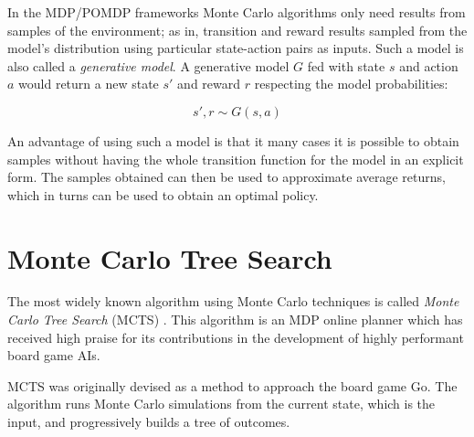 In the MDP/POMDP frameworks Monte Carlo algorithms only need results from samples of the
environment; as in, transition and reward results sampled from the model's distribution using
particular state-action pairs as inputs. Such a model is also called a \textit{generative model}. A
generative model $G$ fed with state $s$ and action $a$ would return a new state $s'$ and reward $r$
respecting the model probabilities:

\[ s', r \sim G(s, a) \]

An advantage of using such a model is that it many cases it is possible to obtain samples without
having the whole transition function for the model in an explicit form. The samples obtained can
then be used to approximate average returns, which in turns can be used to obtain an optimal policy.

\section{Monte Carlo Tree Search}

The most widely known algorithm using Monte Carlo techniques is called \textit{Monte Carlo Tree
Search} (MCTS) \cite{cit:mcts}. This algorithm is an MDP online planner which has received high
praise for its contributions in the development of highly performant board game AIs.

MCTS was originally devised as a method to approach the board game Go. The algorithm runs Monte
Carlo simulations from the current state, which is the input, and progressively builds
a tree of outcomes.

